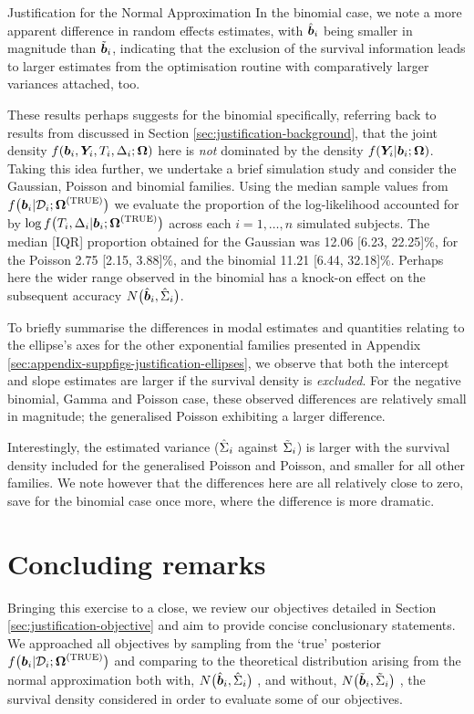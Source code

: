 \begin{chapter}{\label{cha:justification}Justification for the Normal Approximation}
  In the binomial case, we note a more apparent difference in random effects estimates, with $\hat{\bm{b}}_i$ being smaller in magnitude than $\tilde{\bm{b}}_i$, indicating that the exclusion of the survival information leads to larger estimates from the optimisation routine with comparatively larger variances attached, too.

  These results perhaps suggests for the binomial specifically, referring back to results from \citet{Rizopoulos2012} discussed in Section \ref{sec:justification-background}, that the joint density $f\!\left(\bm{b}_i,\bm{Y}_i,T_i,\Delta_i;\bm{\mathrm{\Omega}}\right)$ here is \textit{not} dominated by the density $f\!\left(\bm{Y}_i|\bm{b}_i;\bm{\mathrm{\Omega}}\right)$. Taking this idea further, we undertake a brief simulation study and consider the Gaussian, Poisson and binomial families. Using the median sample values from $f\big(\bm{b}_i|\mathcal{D}_i;\bm{\mathrm{\Omega}}^{(\mathrm{TRUE})}\big)$ we evaluate the proportion of the log-likelihood accounted for by $\log f\big(T_i,\Delta_i|\bm{b}_i;\bm{\mathrm{\Omega}}^{(\mathrm{TRUE})}\big)$ across each $i=1,\ldots,n$ simulated subjects. The median [IQR] proportion obtained for the Gaussian was 12.06 [6.23, 22.25]\%, for the Poisson 2.75 [2.15, 3.88]\%, and the binomial 11.21 [6.44, 32.18]\%. Perhaps here the wider range observed in the binomial has a knock-on effect on the subsequent accuracy $N\big(\hat{\bm{b}}_i,\hat{\Sigma}_i\big)$.

  To briefly summarise the differences in modal estimates and quantities relating to the ellipse's axes for the other exponential families presented in Appendix \ref{sec:appendix-suppfigs-justification-ellipses}, we observe that both the intercept and slope estimates are larger if the survival density is \textit{excluded}. For the negative binomial, Gamma and Poisson case, these observed differences are relatively small in magnitude; the generalised Poisson exhibiting a larger difference.
  
  Interestingly, the estimated variance (\ie $\hat{\Sigma}_i$ against $\tilde{\Sigma}_i$) is larger with the survival density included for the generalised Poisson and Poisson, and smaller for all other families. We note however that the differences here are all relatively close to zero, save for the binomial case once more, where the difference is more dramatic.

  \section{Concluding remarks}\label{sec:justification-conclusion}
  Bringing this exercise to a close, we review our objectives detailed in Section \ref{sec:justification-objective} and aim to provide concise conclusionary statements. We approached all objectives by sampling from the `true' posterior $f\big(\bm{b}_i|\mathcal{D}_i;\bm{\mathrm{\Omega}}^{(\mathrm{TRUE})}\big)$ and comparing to the theoretical distribution arising from the normal approximation both with, $N\big(\hat{\bm{b}}_i,\hat{\Sigma}_i\big)$ \citep{Bernhardt15, Murray2022, Murray2023}, and without, $N\big(\tilde{\bm{b}}_i,\tilde{\Sigma}_i\big)$ \citep{Rizopoulos2012}, the survival density considered in order to evaluate some of our objectives.


\end{chapter}
